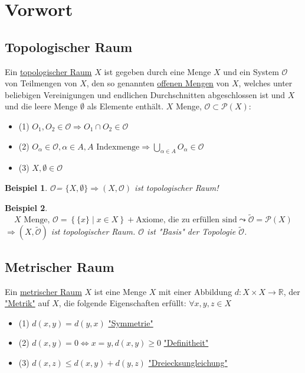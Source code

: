 \documentclass[a4paper,11pt,notitlepage]{report}
\newtheorem{definition}{Definition}[chapter]
\newtheorem{example}{Beispiel}[chapter]
\newcommand{\R}{{\ensuremath{\mathbb{R}}}}
\newcommand{\OO}{{\ensuremath{\mathcal{O}}}}
\newenvironment{Kasten}[1]
{
\hspace{0.05\linewidth}
\begin{center}
\begin{minipage}{0.9\linewidth}
\setlength{\fboxsep}{18pt}
\definecolor{shadecolor}{gray}{0.9}
\definecolor{framecolor}{gray}{0}
\def\FrameCommand{\fcolorbox{framecolor}{shadecolor}}
\MakeFramed {\FrameRestore}
\subsection{#1}
\begin{itshape}
}
{
\end{itshape}
\endMakeFramed
\end{minipage}
\end{center}
\vspace{1em}
}
\begin{document}
\section{Vorwort}


\begin{Kasten}{Topologischer Raum}
Ein \underline{topologischer Raum} $X$ ist gegeben durch eine Menge $X$ und ein System $\OO$ von Teilmengen von $X$, den so genannten \underline{offenen Mengen} von $X$, welches unter beliebigen Vereinigungen und endlichen Durchschnitten abgeschlossen ist und $X$ und die leere Menge $\emptyset$ als Elemente enthält.
\newline
$X$ Menge, $\OO \subset \mathcal{P}(X) \colon$
\begin{itemize}
	\item (1) $O_1, O_2 \in \OO \Rightarrow O_1 \cap O_2 \in \OO$
	\item (2) $O_\alpha \in \OO, \alpha \in A, A \text{ Indexmenge} \Rightarrow \bigcup\limits_{\alpha \in A}{O_\alpha} \in \OO$
	\item (3) $X, \emptyset \in \OO$
\end{itemize}
\end{Kasten}

\begin{example}
\OO = $\{X, \emptyset\} \Rightarrow (X,\OO)$ ist topologischer Raum!
\end{example}

\begin{example}
$$X \text{ Menge, }\OO = \left\{\{x\} \mid x\in X\right\} + \text{Axiome, die zu erfüllen sind} \leadsto \tilde{\OO} = \mathcal{P}(X)$$
$\Rightarrow (X,\tilde{\OO})$ ist topologischer Raum.
$\OO$ ist "Basis" der Topologie $\tilde{\OO}$.
\end{example}

\begin{Kasten}{Metrischer Raum}
Ein \underline{metrischer Raum} $X$ ist eine Menge $X$ mit einer Abbildung $d \colon X \times X \rightarrow \R$, der \underline{"Metrik"} auf $X$, die folgende Eigenschaften erfüllt:
$\forall x,y,z \in X$
\begin{itemize}
	\item (1) $d(x,y) = d(y,x)$ \underline{"Symmetrie"}
	\item (2) $d(x,y) = 0 \Leftrightarrow x = y, d(x,y) \geq 0$ \underline{"Definitheit"}
	\item (3) $d(x,z) \leq d(x,y) + d(y,z)$ \underline{"Dreiecksungleichung"}
\end{itemize}
\end{Kasten}
\end{document}
